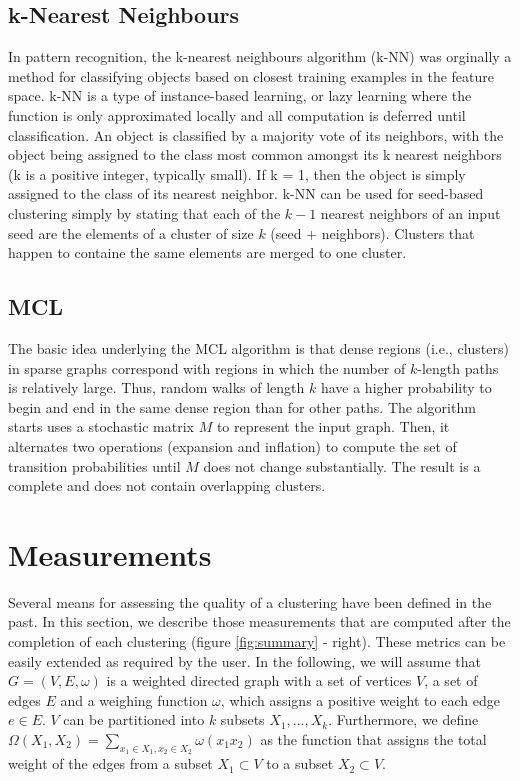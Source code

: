 \documentclass[a4paper, 11pt]{article}
\begin{document}
	\subsection{k-Nearest Neighbours} \label{sec:knn}
		In pattern recognition, the k-nearest neighbours algorithm (k-NN) was orginally a method
		for classifying objects based on closest training examples in the feature space. 
		k-NN is a type of instance-based learning, or lazy learning where the function is only approximated locally and all 
		computation is deferred until classification. An object is classified by a majority vote of its neighbors, 
		with the object being assigned to the class most common amongst its k nearest neighbors (k is a positive integer, typically small). 
		If k = 1, then the object is simply assigned to the class of its nearest neighbor. 
		k-NN can be used for seed-based clustering simply by stating that each of the $k-1$ nearest neighbors of an input seed 
		are the elements of a cluster of size $k$ (seed + neighbors). 
		Clusters that happen to containe the same elements are merged to one cluster.
	
	\subsection{MCL} \label{sec:mcl}
		The basic idea underlying the MCL algorithm \cite{5} is that dense regions (i.e., clusters) in sparse graphs correspond 
		with regions in which the number of $k$-length paths is relatively large. 
		Thus, random walks of length $k$ have a higher probability to begin and end in the same dense region than for other paths. 
		The algorithm starts uses a stochastic matrix $M$ to represent the input graph. 
		Then, it alternates two operations (expansion and inflation) to compute the set of transition probabilities until 
		$M$ does not change substantially. The result is a complete and does not contain overlapping clusters. 

\section{Measurements} \label{sec:mes}
	Several means for assessing the quality of a clustering have been defined in the past.
	In this section, we describe those measurements that are computed after the completion of each clustering (figure \ref{fig:summary} - right). 
	These metrics can be easily extended as required by the user. 
	In the following, we will assume that $G = (V, E, \omega)$ is a weighted directed graph with a set of vertices $V$, 
	a set of edges $E$ and a weighing function $\omega$, which assigns a positive weight to each edge $e \in E$.
	$V$ can be partitioned into $k$ subsets $X_{1},...,X_{k}$.
	Furthermore, we define $\Omega(X_{1},X_{2}) = \sum_{x_{1} \in X_{1}, x_{2} \in X_{2}} \omega(x_{1}x_{2})$ as
	the function that assigns the total weight of the edges from a subset $X_{1} \subset V$ to a subset $X_{2} \subset V$.
	
\end{document}
